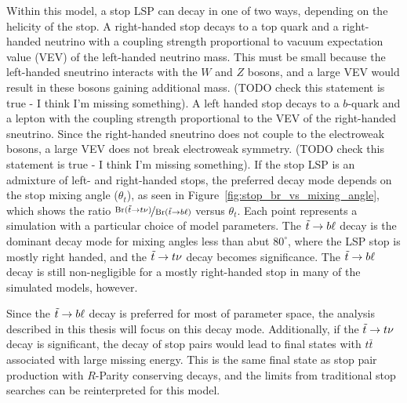 Within this model, a stop LSP can decay in one of two ways, depending on
the helicity of the stop.
A right-handed stop decays to a top quark and a right-handed neutrino with a
coupling strength proportional to vacuum expectation value (VEV) of the
left-handed neutrino mass.
This must be small because the left-handed sneutrino interacts with the
$W$ and $Z$ bosons, and a large VEV would result in these bosons gaining
additional mass.
{\color{red} (TODO check this statement is true - I think I'm missing
something).}
A left handed stop decays to a $b$-quark and a lepton with the coupling
strength proportional to the VEV of the right-handed sneutrino.
Since the right-handed sneutrino does not couple to the electroweak bosons,
a large VEV does not break electroweak symmetry.
{\color{red} (TODO check this statement is true - I think I'm missing
something)}.
If the stop LSP is an admixture of left- and right-handed stops, the preferred
decay mode depends on the stop mixing angle ($\theta_t$), as seen in
Figure~\ref{fig:stop_br_vs_mixing_angle}, which shows the ratio
$\nicefrac{\mathrm{Br}(\tilde{t} \rightarrow t\nu)}{\mathrm{Br}(\tilde{t} \rightarrow b\ell)}$
versus $\theta_t$.
Each point represents a simulation with a particular choice of model parameters.
The $\tilde{t} \rightarrow b\ell$ decay is the dominant decay mode for mixing
angles less than abut $80^{\circ}$, where the LSP stop is mostly right handed,
and the $\tilde{t} \rightarrow t\nu$ decay becomes significance.
The $\tilde{t} \rightarrow b\ell$ decay is still non-negligible for a mostly right-handed
stop in many of the simulated models,
however.\cite{Marshall:2014kea, Marshall:2014cwa}

Since the $\tilde{t} \rightarrow b\ell$ decay is preferred for most of parameter space,
the analysis described in this thesis will focus on this decay mode.
Additionally, if the $\tilde{t} \rightarrow t\nu$ decay is significant, the decay of stop
pairs would lead to final states with $t\bar{t}$ associated with large missing
energy.
This is the same final state as stop pair production with $R$-Parity conserving
decays, and the limits from traditional stop searches can be reinterpreted for
this model.

